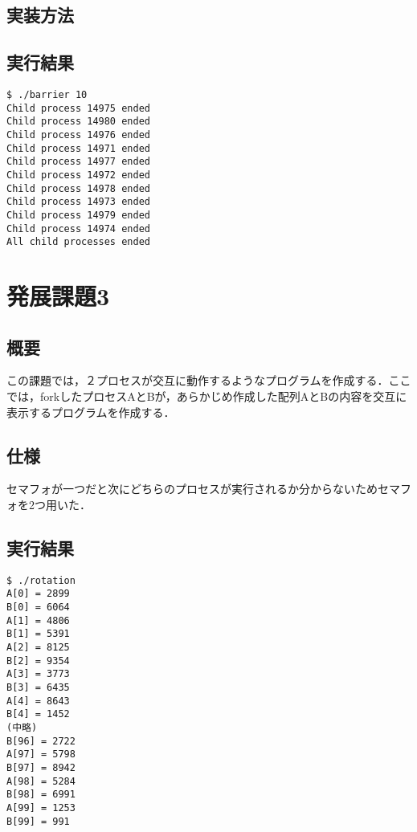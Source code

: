 \documentclass[a4j,10pt,titlepage]{jsarticle}
\begin{document}
\subsection{実装方法}

\subsection{実行結果}
\begin{verbatim}
$ ./barrier 10
Child process 14975 ended
Child process 14980 ended
Child process 14976 ended
Child process 14971 ended
Child process 14977 ended
Child process 14972 ended
Child process 14978 ended
Child process 14973 ended
Child process 14979 ended
Child process 14974 ended
All child processes ended
\end{verbatim}
\section{発展課題3}
\subsection{概要}
この課題では，２プロセスが交互に動作するようなプログラムを作成する．ここでは，forkしたプロセスAとBが，あらかじめ作成した配列AとBの内容を交互に表示するプログラムを作成する．

\subsection{仕様}
セマフォが一つだと次にどちらのプロセスが実行されるか分からないためセマフォを2つ用いた．
\subsection{実行結果}
\begin{verbatim}
$ ./rotation 
A[0] = 2899
B[0] = 6064
A[1] = 4806
B[1] = 5391
A[2] = 8125
B[2] = 9354
A[3] = 3773
B[3] = 6435
A[4] = 8643
B[4] = 1452
(中略)
B[96] = 2722
A[97] = 5798
B[97] = 8942
A[98] = 5284
B[98] = 6991
A[99] = 1253
B[99] = 991
\end{verbatim}
\end{document}
